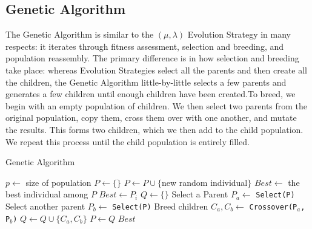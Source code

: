         \subsection{Genetic Algorithm}
            The Genetic Algorithm is similar to the $(\mu, \lambda)$ Evolution Strategy in many respects: it iterates through fitness assessment, selection and breeding, and population reassembly. The primary difference is in how selection and breeding take place: whereas Evolution Strategies select all the parents and then create all the children, the Genetic Algorithm little-by-little selects a few parents and generates a few children until enough children have been created.To breed, we begin with an empty population of children. We then select two parents from the original population, copy them, cross them over with one another, and mutate the results. This forms two children, which we then add to the child population. We repeat this process until the child population is entirely filled.

            \begin{algorithm}[!htp]
                \centering
                \caption{Genetic Algorithm}
                \begin{algorithmic}[1]
                    \State $p \gets$ size of population
                    \State $P \gets \{\}$
                        \State $P \gets P \cup \{$new random individual$\}$
                    \EndWhile
                    \State $Best \gets$ the best individual among $P$
                                \State $Best \gets P_i$
                            \EndIf
                        \EndFor
                        \State $Q \gets \{\}$
                            \State Select a Parent $P_a \gets$ \texttt{Select(P)}
                            \State Select another parent $P_b \gets$ \texttt{Select(P)}
                            \State Breed children $C_a, C_b \gets$ \texttt{Crossover(P$_a$, P$_b$)}
                            \State $Q \gets Q \cup \{C_a, C_b\}$
                        \EndFor
                        \State $P \gets Q$
                    \EndWhile
                    \State \Return $Best$
                \end{algorithmic}
            \end{algorithm}

